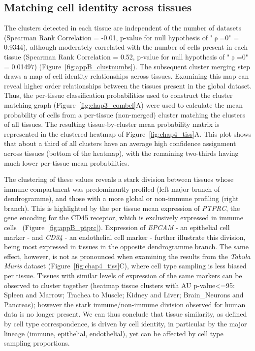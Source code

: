 \subsection{Matching cell identity across tissues}
\label{section_tissues}
The clusters detected in each tissue are independent of the number of datasets (Spearman Rank Correlation = -0.01, p-value for null hypothesis of "${\uprho}$=0" = 0.9344), although moderately correlated with the number of cells present in each tissue (Spearman Rank Correlation = 0.52, p-value for null hypothesis of "${\uprho}$=0" = 0.01497) (Figure~\ref{fig:appB_clustnumbs}). The subsequent cluster merging step draws a map of cell identity relationships across tissues. Examining this map can reveal higher order relationships between the tissues present in the global dataset. Thus, the per-tissue classification probabilities used to construct the cluster matching graph (Figure~\ref{fig:chap3_combcl}A) were used to calculate the mean probability of cells from a per-tissue (non-merged) cluster matching the clusters of all tissues. The resulting tissue-by-cluster mean probability matrix is represented in the clustered heatmap of Figure~\ref{fig:chap4_tiss}A. This plot shows that about a third of all clusters have an average high confidence assignment across tissues (bottom of the heatmap), with the remaining two-thirds having much lower per-tissue mean probabilities. 

The clustering of these values reveals a stark division between tissues whose immune compartment was predominantly profiled (left major branch of dendrogramme), and those with a more global or non-immune profiling (right branch). This is highlighted by the per tissue mean expression of \textit{PTPRC}, the gene encoding for the CD45 receptor, which is exclusively expressed in immune cells~\citep{altin_role_1997} (Figure~\ref{fig:appB_ptprc}). Expression of \textit{EPCAM} - an epithelial cell marker - and \textit{CD34} - an endothelial cell marker - further illustrate this division, being most expressed in tissues in the opposite dendrogramme branch. The same effect, however, is not as pronounced when examining the results from the \textit{Tabula Muris} dataset (Figure~\ref{fig:chap4_tiss}C), where cell type sampling is less biased per tissue. Tissues with similar levels of expression of the same markers can be observed to cluster together (heatmap tissue clusters with AU p-value<=95: Spleen and Marrow; Trachea to Muscle; Kidney and Liver; Brain\_Neurons and Pancreas); however the stark immune/non-immune division observed for human data is no longer present. We can thus conclude that tissue similarity, as defined by cell type correspondence, is driven by cell identity, in particular by the major lineage (immune, epithelial, endothelial), yet can be affected by cell type sampling proportions.

